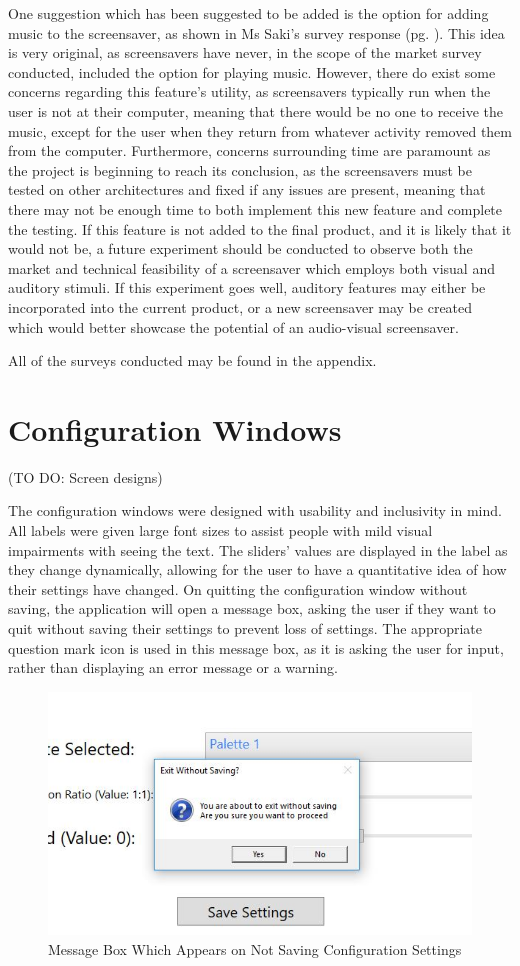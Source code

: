 \documentclass[10pt, openany]{book}
\begin{document}
One suggestion which has been suggested to be added is the option for adding music to the screensaver, as shown in Ms Saki's survey response (pg. \pageref{app:survey-aartee}). This idea is very original, as screensavers have never, in the scope of the market survey conducted, included the option for playing music. However, there do exist some concerns regarding this feature's utility, as screensavers typically run when the user is not at their computer, meaning that there would be no one to receive the music, except for the user when they return from whatever activity removed them from the computer. Furthermore, concerns surrounding time are paramount as the project is beginning to reach its conclusion, as the screensavers must be tested on other architectures and fixed if any issues are present, meaning that there may not be enough time to both implement this new feature and complete the testing. If this feature is not added to the final product, and it is likely that it would not be, a future experiment should be conducted to observe both the market and technical feasibility of a screensaver which employs both visual and auditory stimuli. If this experiment goes well, auditory features may either be incorporated into the current product, or a new screensaver may be created which would better showcase the potential of an audio-visual screensaver.

All of the surveys conducted may be found in the appendix.

\section{Configuration Windows}

(TO DO: Screen designs)

The configuration windows were designed with usability and inclusivity in mind. All labels were given large font sizes to assist people with mild visual impairments with seeing the text. The sliders' values are displayed in the label as they change dynamically, allowing for the user to have a quantitative idea of how their settings have changed. On quitting the configuration window without saving, the application will open a message box, asking the user if they want to quit without saving their settings to prevent loss of settings. The appropriate question mark icon is used in this message box, as it is asking the user for input, rather than displaying an error message or a warning.

\begin{figure}[H]
	\centering
	\includegraphics[width=.5\linewidth]{ExitWithoutSaving}
	\caption[Configuration Window Message Box]{Message Box Which Appears on Not Saving Configuration Settings}
\end{figure}	
\end{document}
